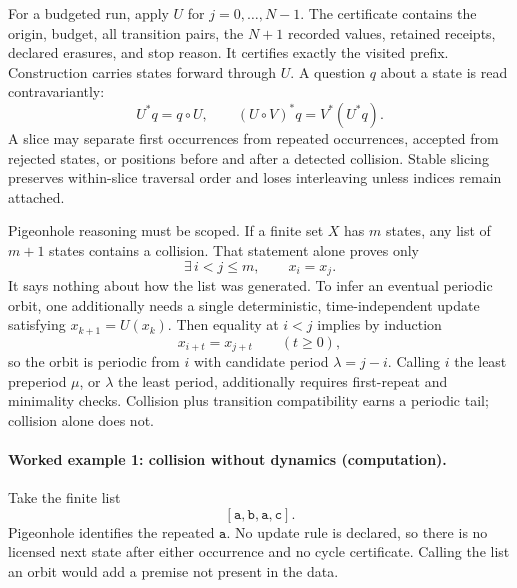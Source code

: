 For a budgeted run, apply \(U\) for \(j=0,\ldots,N-1\).  The certificate contains the origin, budget, all transition
pairs, the \(N+1\) recorded values, retained receipts, declared erasures, and stop reason.  It certifies exactly the
visited prefix.  Construction carries states forward through \(U\).  A question \(q\) about a state is read
contravariantly:
\[
                 U^*q=q\circ U,\qquad
                 (U\circ V)^*q=V^*(U^*q).
\]
A slice may separate first occurrences from repeated occurrences, accepted from rejected states, or positions before
and after a detected collision.  Stable slicing preserves within-slice traversal order and loses interleaving unless
indices remain attached.

Pigeonhole reasoning must be scoped.  If a finite set \(X\) has \(m\) states, any list of \(m+1\) states contains a
collision.  That statement alone proves only
\[
                    \exists\,i<j\le m,\qquad x_i=x_j.
\]
It says nothing about how the list was generated.  To infer an eventual periodic orbit, one additionally needs a
single deterministic, time-independent update satisfying \(x_{k+1}=U(x_k)\).  Then equality at \(i<j\) implies by
induction
\[
                    x_{i+t}=x_{j+t}\qquad(t\ge0),
\]
so the orbit is periodic from \(i\) with candidate period \(\lambda=j-i\).  Calling \(i\) the least preperiod
\(\mu\), or \(\lambda\) the least period, additionally requires first-repeat and minimality checks.  Collision plus
transition compatibility earns a periodic tail; collision alone does not.

\paragraph{Worked example 1: collision without dynamics (computation).}
Take the finite list
\[
                         [\mathtt a,\mathtt b,\mathtt a,\mathtt c].
\]
Pigeonhole identifies the repeated \(\mathtt a\).  No update rule is declared, so there is no licensed next state after
either occurrence and no cycle certificate.  Calling the list an orbit would add a premise not present in the data.

